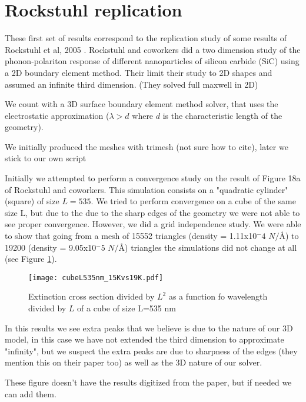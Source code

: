 
\section{Rockstuhl replication}

These first set of results correspond to the replication study of some results 
of Rockstuhl et al, 2005 \cite{rockstuhl2005}. Rockstuhl and coworkers did a two dimension 
study of the phonon-polariton response of different nanoparticles of silicon carbide (SiC)
using a 2D boundary element method. Their limit their study to 2D shapes and assumed an infinite
third dimension. (They solved full maxwell in 2D)


We count with a 3D surface boundary element method solver, that uses the electrostatic approximation
($\lambda > d$ where $d$ is the characteristic length of the geometry). 

{\color{red}We initially produced the meshes with trimesh (not sure how to cite), later we stick to 
our own script}

Initially we attempted to perform a convergence study on the result of Figure 18a
of Rockstuhl and coworkers. This simulation consists on a "quadratic cylinder" (square)
of size $L=535$. We tried to perform convergence on a cube of the same size L, but
due to the due to the sharp edges of the geometry we were not able to see proper convergence. 
However, we did a grid independence study. We were able to show that going from a mesh of 15552 
triangles (density = 1.11x10$^-4$ $N/\text{\AA}$) to 19200 (density = 9.05x10$^-5$ $N/\text{\AA}$) 
triangles the simulations did not change at all (see Figure \ref{fig:cube535}).  

\begin{figure}
    \centering
    \texttt{[image: cubeL535nm\_15Kvs19K.pdf]} 
    \caption{Extinction cross section divided by $L^2$ as a function fo wavelength divided by $L$ of
    a cube of size L=535 nm}
    \label{fig:cube535}
 \end{figure}

In this results we see extra peaks that we believe is due to the nature of our 3D model, in this case 
we have not extended the third dimension to approximate "infinity", but we suspect the extra peaks are 
due to sharpness of the edges (they mention this on their paper too) as well as the 3D nature of our solver.

These figure doesn't have the results digitized from the paper, but if needed we can add them. 

